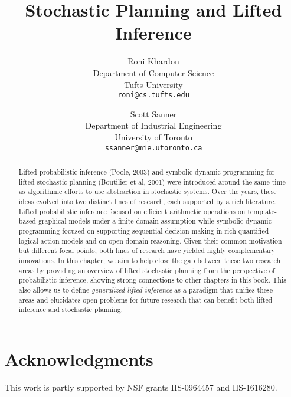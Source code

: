 \documentclass[11pt]{article}
\title{Stochastic Planning and Lifted Inference}
\author{
Roni Khardon \\Department of Computer Science \\ Tufts University \\ {\tt roni@cs.tufts.edu}
\and
Scott Sanner \\ Department of Industrial Engineering \\ University of Toronto\\ {\tt ssanner@mie.utoronto.ca}}
\begin{document}
\maketitle


\begin{abstract}
%
%
%
%
%
%
  Lifted probabilistic inference (Poole, 2003) and symbolic dynamic programming for lifted 
  stochastic planning (Boutilier et al, 2001) were introduced around the same time as algorithmic efforts to use abstraction in  
  stochastic systems.
  Over the years, 
  these ideas
  evolved into two distinct lines of research, each supported by
  a rich literature.
  Lifted probabilistic inference focused
  on efficient arithmetic operations on template-based graphical
  models under a finite domain assumption while symbolic dynamic
  programming focused on supporting sequential decision-making in rich
  quantified logical action models and on open domain reasoning.  Given their
  common motivation but 
  different focal points, both lines of research have yielded 
  highly complementary innovations.  In this chapter, we aim to help close
  the gap between these two research areas by providing an overview of
  lifted stochastic planning from the perspective of probabilistic inference, 
  showing strong connections to other chapters in this book.
  This also allows us to define {\em generalized lifted inference} as a paradigm 
  that unifies these areas
  and elucidates open problems for future research that can benefit
  both lifted inference and stochastic planning.
%
%
%
%
%
%
%
%
%
%
%
%
%
%
%
\end{abstract}








\section*{Acknowledgments} 
This work is partly supported by NSF grants IIS-0964457 and IIS-1616280.



\end{document}
